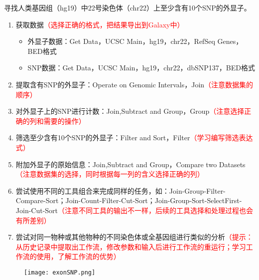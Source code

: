 \documentclass{TIJMUjiaoanSY}
\begin{document}
寻找人类基因组（hg19）中22号染色体（chr22）上至少含有10个SNP的外显子。
\begin{enumerate}
  \item 获取数据\textcolor{red}{（选择正确的格式，把结果导出到Galaxy中）}
    \begin{itemize}
      \item 外显子数据：Get Data，UCSC Main，hg19，chr22，RefSeq Genes，BED格式
      \item SNP数据：Get Data，UCSC Main，hg19，chr22，dbSNP137，BED格式
    \end{itemize}
  \item 提取含有SNP的外显子：Operate on Genomic Intervals，Join\textcolor{red}{（注意数据集的顺序）}
  \item 对外显子上的SNP进行计数：Join,Subtract and Group，Group\textcolor{red}{（注意选择正确的列和需要的操作）}
  \item 筛选至少含有10个SNP的外显子：Filter and Sort，Filter\textcolor{red}{（学习编写筛选表达式）}
  \item 附加外显子的原始信息：Join,Subtract and Group，Compare two Datasets\textcolor{red}{（注意数据集的选择，同时根据每一列的含义选择正确的列）}
  \item 尝试使用不同的工具组合来完成同样的任务，如：Join-Group-Filter-Compare-Sort；Join-Count-Filter-Cut-Sort；Join-Group-Sort-SelectFirst-Join-Cut-Sort\textcolor{red}{（注意不同工具的输出不一样，后续的工具选择和处理过程也会有所差别）}
  \item 尝试对同一物种或其他物种的不同染色体或全基因组进行类似的分析\textcolor{red}{（提示：从历史记录中提取出工作流，修改参数和输入后进行工作流的重运行；学习工作流的使用，了解工作流的优势）}
\end{enumerate}

\begin{figure}[ht]
  \centering
  \texttt{[image: exonSNP.png]}
\end{figure}


\otherTail
\end{document}
